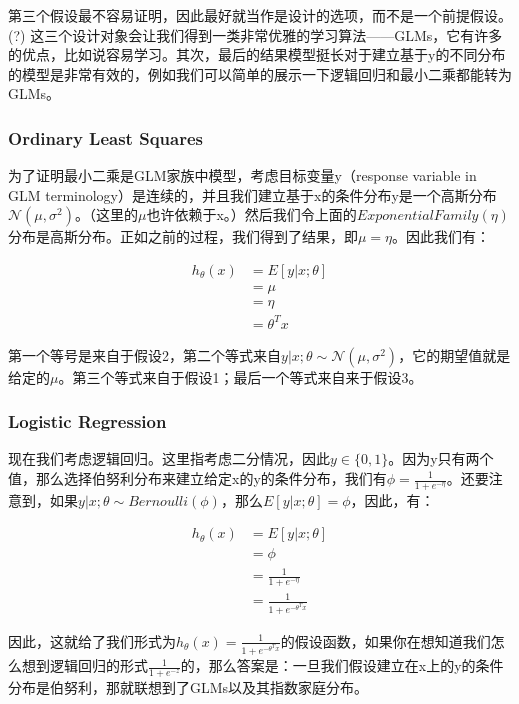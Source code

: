 \documentclass[UTF8]{ctexart}
\begin{document}
第三个假设最不容易证明，因此最好就当作是设计的选项，而不是一个前提假设。(?) 这三个设计对象会让我们得到一类非常优雅的学习算法——GLMs，它有许多的优点，比如说容易学习。其次，最后的结果模型挺长对于建立基于y的不同分布的模型是非常有效的，例如我们可以简单的展示一下逻辑回归和最小二乘都能转为GLMs。




\subsubsection{Ordinary Least Squares}

为了证明最小二乘是GLM家族中模型，考虑目标变量y（response variable in GLM terminology）是连续的，并且我们建立基于x的条件分布y是一个高斯分布$\mathcal{N}(\mu,\sigma^{2})$。（这里的$\mu$也许依赖于x。）然后我们令上面的$ExponentialFamily(\eta)$分布是高斯分布。正如之前的过程，我们得到了结果，即$\mu=\eta$。因此我们有：

\begin{align*}
h_{\theta}(x) & = E[y|x;\theta]\\
& = \mu \\
& = \eta \\
& = \theta^{T}x
\end{align*}

第一个等号是来自于假设2，第二个等式来自$y|x;\theta\sim \mathcal{N}(\mu,\sigma^{2})$，它的期望值就是给定的$\mu$。第三个等式来自于假设1；最后一个等式来自来于假设3。

\subsubsection{Logistic Regression}

现在我们考虑逻辑回归。这里指考虑二分情况，因此$y\in \{0,1\}$。因为y只有两个值，那么选择伯努利分布来建立给定x的y的条件分布，我们有$\phi = \frac{1}{1+e^{-\eta}}$。还要注意到，如果$y|x;\theta\sim Bernoulli(\phi)$，那么$E[y|x;\theta]=\phi$，因此，有：


\begin{align*}
h_{\theta}(x) & = E[y|x;\theta]\\
& = \phi \\
& = \frac{1}{1+e^{-\eta}} \\
& =  \frac{1}{1+e^{-\theta^{T}x}}
\end{align*}

因此，这就给了我们形式为$h_{\theta}(x) = \frac{1}{1+e^{-\theta^{T}x}} $的假设函数，如果你在想知道我们怎么想到逻辑回归的形式$\frac{1}{1+e^{-z}}$的，那么答案是：一旦我们假设建立在x上的y的条件分布是伯努利，那就联想到了GLMs以及其指数家庭分布。
\end{document}
